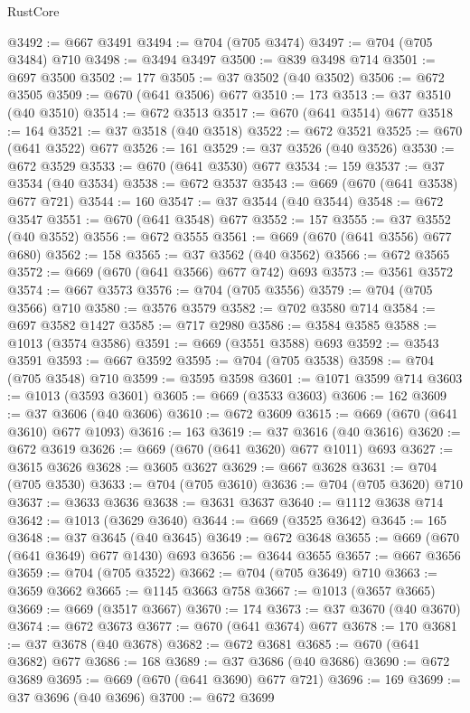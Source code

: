 \begin{lexlean}{RustCore}
\begin{coremodule}
@3492 := @667 @3491
@3494 := @704 (@705 @3474)
@3497 := @704 (@705 @3484) @710
@3498 := @3494 @3497
@3500 := @839 @3498 @714
@3501 := @697 @3500
@3502 := 177
@3505 := @37 @3502 (@40 @3502)
@3506 := @672 @3505
@3509 := @670 (@641 @3506) @677
@3510 := 173
@3513 := @37 @3510 (@40 @3510)
@3514 := @672 @3513
@3517 := @670 (@641 @3514) @677
@3518 := 164
@3521 := @37 @3518 (@40 @3518)
@3522 := @672 @3521
@3525 := @670 (@641 @3522) @677
@3526 := 161
@3529 := @37 @3526 (@40 @3526)
@3530 := @672 @3529
@3533 := @670 (@641 @3530) @677
@3534 := 159
@3537 := @37 @3534 (@40 @3534)
@3538 := @672 @3537
@3543 := @669 (@670 (@641 @3538) @677 @721)
@3544 := 160
@3547 := @37 @3544 (@40 @3544)
@3548 := @672 @3547
@3551 := @670 (@641 @3548) @677
@3552 := 157
@3555 := @37 @3552 (@40 @3552)
@3556 := @672 @3555
@3561 := @669 (@670 (@641 @3556) @677 @680)
@3562 := 158
@3565 := @37 @3562 (@40 @3562)
@3566 := @672 @3565
@3572 := @669 (@670 (@641 @3566) @677 @742) @693
@3573 := @3561 @3572
@3574 := @667 @3573
@3576 := @704 (@705 @3556)
@3579 := @704 (@705 @3566) @710
@3580 := @3576 @3579
@3582 := @702 @3580 @714
@3584 := @697 @3582 @1427
@3585 := @717 @2980
@3586 := @3584 @3585
@3588 := @1013 (@3574 @3586)
@3591 := @669 (@3551 @3588) @693
@3592 := @3543 @3591
@3593 := @667 @3592
@3595 := @704 (@705 @3538)
@3598 := @704 (@705 @3548) @710
@3599 := @3595 @3598
@3601 := @1071 @3599 @714
@3603 := @1013 (@3593 @3601)
@3605 := @669 (@3533 @3603)
@3606 := 162
@3609 := @37 @3606 (@40 @3606)
@3610 := @672 @3609
@3615 := @669 (@670 (@641 @3610) @677 @1093)
@3616 := 163
@3619 := @37 @3616 (@40 @3616)
@3620 := @672 @3619
@3626 := @669 (@670 (@641 @3620) @677 @1011) @693
@3627 := @3615 @3626
@3628 := @3605 @3627
@3629 := @667 @3628
@3631 := @704 (@705 @3530)
@3633 := @704 (@705 @3610)
@3636 := @704 (@705 @3620) @710
@3637 := @3633 @3636
@3638 := @3631 @3637
@3640 := @1112 @3638 @714
@3642 := @1013 (@3629 @3640)
@3644 := @669 (@3525 @3642)
@3645 := 165
@3648 := @37 @3645 (@40 @3645)
@3649 := @672 @3648
@3655 := @669 (@670 (@641 @3649) @677 @1430) @693
@3656 := @3644 @3655
@3657 := @667 @3656
@3659 := @704 (@705 @3522)
@3662 := @704 (@705 @3649) @710
@3663 := @3659 @3662
@3665 := @1145 @3663 @758
@3667 := @1013 (@3657 @3665)
@3669 := @669 (@3517 @3667)
@3670 := 174
@3673 := @37 @3670 (@40 @3670)
@3674 := @672 @3673
@3677 := @670 (@641 @3674) @677
@3678 := 170
@3681 := @37 @3678 (@40 @3678)
@3682 := @672 @3681
@3685 := @670 (@641 @3682) @677
@3686 := 168
@3689 := @37 @3686 (@40 @3686)
@3690 := @672 @3689
@3695 := @669 (@670 (@641 @3690) @677 @721)
@3696 := 169
@3699 := @37 @3696 (@40 @3696)
@3700 := @672 @3699

\end{coremodule}
\end{lexlean}
